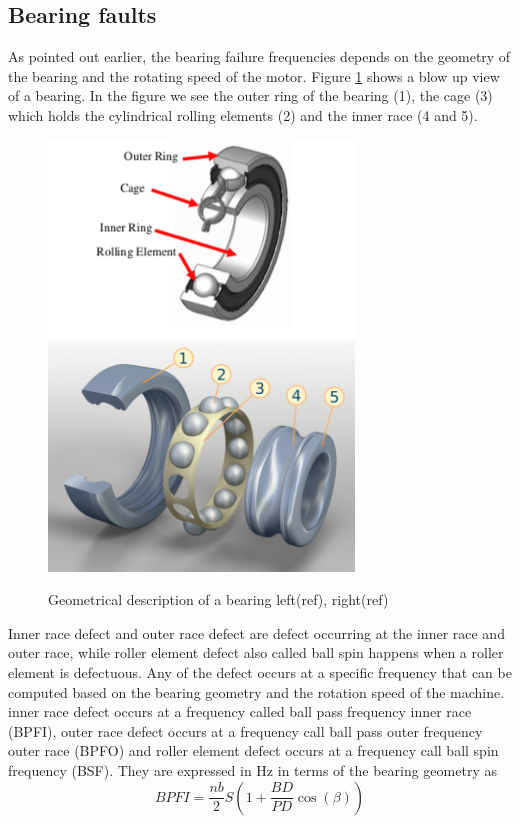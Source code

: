 \documentclass[../Main/thesis.tex]{subfiles}
\begin{document}
\subsection{Bearing faults}
\label{sec:fault}
As pointed out earlier, the bearing failure frequencies depends on the geometry of the bearing and the rotating speed of the motor. Figure \ref{fig:bearing} shows a blow up view of a bearing. In the figure we see the outer ring of the bearing (1), the cage (3) which holds the cylindrical rolling elements (2) and the inner race (4 and 5).
\begin{figure}[H] %
   \centering
   \includegraphics[width=3.2in]{../fig/bearing} 
    \includegraphics[width=3.2in]{../fig/bearing-s} 
   \caption{Geometrical description of a bearing left(ref), right(ref)}
   \label{fig:bearing}
\end{figure}
\justify
Inner race defect and outer race defect are defect occurring at the inner race and outer race, while roller element defect also called ball spin happens when a roller element is defectuous. Any of the defect occurs at a specific frequency that can be computed based on the bearing geometry and the rotation speed of the machine. inner race defect occurs at a frequency called ball pass frequency inner race (BPFI), outer race defect occurs at a frequency call ball pass outer frequency outer race (BPFO) and roller element defect occurs at a frequency call ball spin frequency (BSF). They are expressed in Hz in terms of the bearing geometry as 
\begin{equation}\label{eq:bpfi}
BPFI = \frac{nb}{2}S\left( 1 +  \frac{BD}{PD}\cos(\beta)  \right)
\end{equation}
\end{document}

